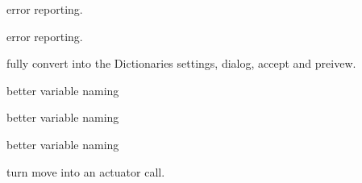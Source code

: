 \begin{DoxyRefList}
\item[Member \mbox{\hyperlink{interface_8cpp_a0eca4d9adccf7ea7711afaaa4bfb2843}{set\+\_\+enabled}} (QObject $\ast$parent, const char $\ast$key, bool enabled)]\label{todo__todo000004}%
%
error reporting.  
\item[Member \mbox{\hyperlink{interface_8cpp_adc2edf17601102cd3f68307eb8fb93d9}{set\+\_\+visibility}} (QObject $\ast$parent, const char $\ast$key, bool visibility)]\label{todo__todo000005}%
%
error reporting.  
\item[Member \mbox{\hyperlink{embroidermodder_8h_ab057e1afb884d1e29ecc02ebc883a8f1}{Settings}} ]\label{todo__todo000002}%
%
fully convert into the Dictionaries settings, dialog, accept and preivew.  
\item[Member \mbox{\hyperlink{structSubDescriptor___affb2c75b7f632338f368aafab49f678d}{Sub\+Descriptor\+\_\+\+::color\+Code}} ]\label{todo__todo000206}%
%
better variable naming  
\item[Member \mbox{\hyperlink{structSubDescriptor___a0cfe04519ff6dab092ee7c002e55e520}{Sub\+Descriptor\+\_\+\+::some\+Int}} ]\label{todo__todo000204}%
%
better variable naming  
\item[Member \mbox{\hyperlink{structSubDescriptor___a6154b0f4ec7815c6d26c71852506418e}{Sub\+Descriptor\+\_\+\+::some\+Other\+Int}} ]\label{todo__todo000205}%
%
better variable naming  
\item[Member \mbox{\hyperlink{classView_ae820c6a86f0a1908bf451f86db043489}{View\+::mouse\+Move\+Event}} (QMouse\+Event $\ast$event)]\label{todo__todo000200}%
%
turn move into an actuator call. 
\end{DoxyRefList}